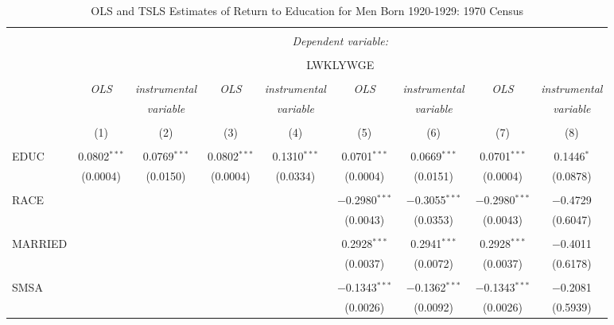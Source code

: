 \documentclass{article}
\begin{document}
\begin{sidewaystable}[!htbp] \centering 
  \caption{OLS and TSLS Estimates of Return to Education for Men Born 
    1920-1929: 1970 Census} 
  \label{} 
\begin{tabular}{@{\extracolsep{5pt}}lcccccccc} 
\\[-1.8ex]\hline 
\hline \\[-1.8ex] 
 & \multicolumn{8}{c}{\textit{Dependent variable:}} \\ 
\cline{2-9} 
\\[-1.8ex] & \multicolumn{8}{c}{LWKLYWGE} \\ 
\\[-1.8ex] & \textit{OLS} & \textit{instrumental} & \textit{OLS} & \textit{instrumental} & \textit{OLS} & \textit{instrumental} & \textit{OLS} & \textit{instrumental} \\ 
 & \textit{} & \textit{variable} & \textit{} & \textit{variable} & \textit{} & \textit{variable} & \textit{} & \textit{variable} \\ 
\\[-1.8ex] & (1) & (2) & (3) & (4) & (5) & (6) & (7) & (8)\\ 
\hline \\[-1.8ex] 
 EDUC & 0.0802$^{***}$ & 0.0769$^{***}$ & 0.0802$^{***}$ & 0.1310$^{***}$ & 0.0701$^{***}$ & 0.0669$^{***}$ & 0.0701$^{***}$ & 0.1446$^{*}$ \\ 
  & (0.0004) & (0.0150) & (0.0004) & (0.0334) & (0.0004) & (0.0151) & (0.0004) & (0.0878) \\ 
  & & & & & & & & \\ 
 RACE &  &  &  &  & $-$0.2980$^{***}$ & $-$0.3055$^{***}$ & $-$0.2980$^{***}$ & $-$0.4729 \\ 
  &  &  &  &  & (0.0043) & (0.0353) & (0.0043) & (0.6047) \\ 
  & & & & & & & & \\ 
 MARRIED &  &  &  &  & 0.2928$^{***}$ & 0.2941$^{***}$ & 0.2928$^{***}$ & $-$0.4011 \\ 
  &  &  &  &  & (0.0037) & (0.0072) & (0.0037) & (0.6178) \\ 
  & & & & & & & & \\ 
 SMSA &  &  &  &  & $-$0.1343$^{***}$ & $-$0.1362$^{***}$ & $-$0.1343$^{***}$ & $-$0.2081 \\ 
  &  &  &  &  & (0.0026) & (0.0092) & (0.0026) & (0.5939) \\ 

\end{tabular}
\end{sidewaystable}
\end{document}
